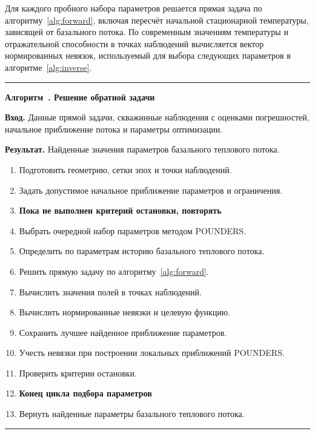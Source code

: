 Для каждого пробного набора параметров решается прямая задача по алгоритму~\ref{alg:forward}, включая пересчёт начальной стационарной температуры, зависящей от базального потока. По современным значениям температуры и отражательной способности в точках наблюдений вычисляется вектор нормированных невязок, используемый для выбора следующих параметров в алгоритме~\ref{alg:inverse}.

\bigskip
\noindent\begin{minipage}{\linewidth}
\hrule
\medskip
{}\label{alg:inverse}
\textbf{Алгоритм~\thereportalgorithm. Решение обратной задачи}

\smallskip
\textbf{Вход.} Данные прямой задачи, скважинные наблюдения с оценками погрешностей, начальное приближение потока и параметры оптимизации.

\textbf{Результат.} Найденные значения параметров базального теплового потока.

\begin{enumerate}
\setlength{\itemsep}{0pt}
\setlength{\parsep}{0pt}
\item Подготовить геометрию, сетки эпох и точки наблюдений.
\item Задать допустимое начальное приближение параметров и ограничения.
\item \textbf{Пока не выполнен критерий остановки, повторять}
\item \hspace*{1em}Выбрать очередной набор параметров методом POUNDERS.
\item \hspace*{1em}Определить по параметрам историю базального теплового потока.
\item \hspace*{1em}Решить прямую задачу по алгоритму~\ref{alg:forward}.
\item \hspace*{1em}Вычислить значения полей в точках наблюдений.
\item \hspace*{1em}Вычислить нормированные невязки и целевую функцию.
\item \hspace*{1em}Сохранить лучшее найденное приближение параметров.
\item \hspace*{1em}Учесть невязки при построении локальных приближений POUNDERS.
\item \hspace*{1em}Проверить критерии остановки.
\item \textbf{Конец цикла подбора параметров}
\item Вернуть найденные параметры базального теплового потока.
\end{enumerate}
\smallskip
\hrule
\end{minipage}

